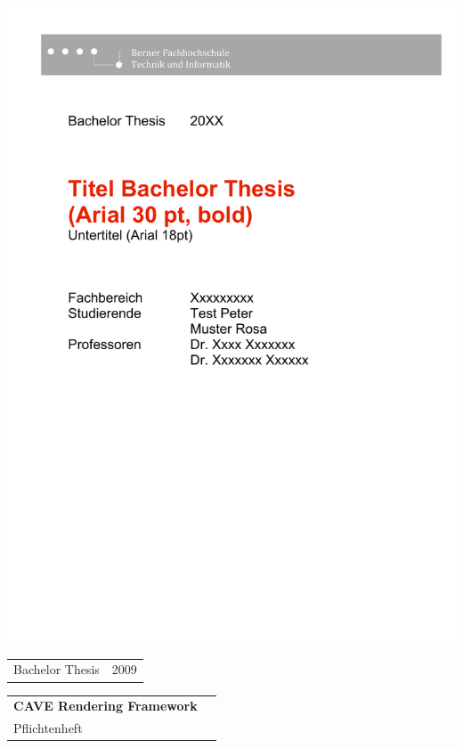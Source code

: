 \begin{titlepage}
 
\begin{flushleft}

\vspace*{-1.9in}\includegraphics{../figures/title_header_de}

\vspace*{2in}

\begin{tabular}{p{5cm}p{8cm}}
\Large{Bachelor Thesis} & \Large{2009} \\ 
\end{tabular}

\vspace{1.5cm}
\begin{tabular}{ll}
\Huge{\bfseries CAVE Rendering Framework}\\[0.4cm]
\huge{Pflichtenheft}\\[1.5cm]
\end{tabular}


\end{flushleft}
\end{titlepage}
